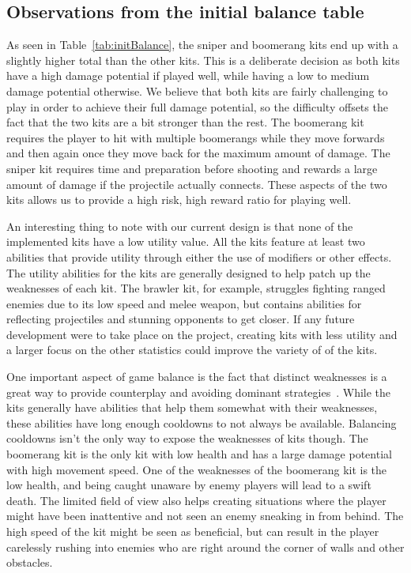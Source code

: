 \subsection{Observations from the initial balance table}     
As seen in Table~\ref{tab:initBalance}, the sniper and boomerang kits end up with a slightly higher total than the other kits. This is a deliberate decision as both kits have a high damage potential if played well, while having a low to medium damage potential otherwise. We believe that both kits are fairly challenging to play in order to achieve their full damage potential, so the difficulty offsets the fact that the two kits are a bit stronger than the rest. 
The boomerang kit requires the player to hit with multiple boomerangs while they move forwards and then again once they move back for the maximum amount of damage. The sniper kit requires time and preparation before shooting and rewards a large amount of damage if the projectile actually connects.  
These aspects of the two kits allows us to provide a high risk, high reward ratio for playing well.

An interesting thing to note with our current design is that none of the implemented kits have a low utility value. All the kits feature at least two abilities that provide utility through either the use of modifiers or other effects. The utility abilities for the kits are generally designed to help patch up the weaknesses of each kit. The brawler kit, for example, struggles fighting ranged enemies due to its low speed and melee weapon, but contains abilities for reflecting projectiles and stunning opponents to get closer. If any future development were to take place on the project, creating kits with less utility and a larger focus on the other statistics could improve the variety of of the kits.

One important aspect of game balance is the fact that distinct weaknesses is a great way to provide counterplay and avoiding dominant strategies~\cite{gameBalanceWeaknesses}. While the kits generally have abilities that help them somewhat with their weaknesses, these abilities have long enough cooldowns to not always be available. Balancing cooldowns isn't the only way to expose the weaknesses of kits though. 
The boomerang kit is the only kit with low health and has a large damage potential with high movement speed. One of the weaknesses of the boomerang kit is the low health, and being caught unaware by enemy players will lead to a swift death. The limited field of view also helps creating situations where the player might have been inattentive and not seen an enemy sneaking in from behind. The high speed of the kit might be seen as beneficial, but can result in the player carelessly rushing into enemies who are right around the corner of walls and other obstacles. 

